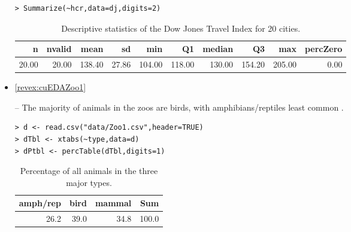 \documentclass[10pt,openany]{book}\usepackage[]{graphicx}\usepackage[]{color}
\makeatletter
\newenvironment{kframe}{%
 \def\at@end@of@kframe{}%
 \ifinner\ifhmode%
  \def\at@end@of@kframe{\end{minipage}}%
  \begin{minipage}{\columnwidth}%
 \fi\fi%
 \def\FrameCommand##1{\hskip\@totalleftmargin \hskip-\fboxsep
 \colorbox{shadecolor}{##1}\hskip-\fboxsep
     \hskip-\linewidth \hskip-\@totalleftmargin \hskip\columnwidth}%
 \MakeFramed {\advance\hsize-\width
   \@totalleftmargin\z@ \linewidth\hsize
   \@setminipage}}%
 {\par\unskip\endMakeFramed%
 \at@end@of@kframe}
\newenvironment{knitrout}{}{} %
\makeatother
\begin{document}
\begin{itemize}
\begin{knitrout}
\end{knitrout}
\begin{knitrout}
\color{fgcolor}\begin{kframe}
\begin{verbatim}
> Summarize(~hcr,data=dj,digits=2)
\end{verbatim}
\end{kframe}
\end{knitrout}
\begin{table}[ht]
\centering
\caption{Descriptive statistics of the Dow Jones Travel Index for 20 cities.} 
\label{tab:DJSum}
\begin{tabular}{rrrrrrrrrr}
  \hline
n & nvalid & mean & sd & min & Q1 & median & Q3 & max & percZero \\ 
  \hline
20.00 & 20.00 & 138.40 & 27.86 & 104.00 & 118.00 & 130.00 & 154.20 & 205.00 & 0.00 \\ 
   \hline
\end{tabular}
\end{table}



  \item \hypertarget{ans:cuEDAZoo1}{\ref{revex:cuEDAZoo1}} -- The majority of animals in the zoos are birds, with amphibians/reptiles least common .
\begin{knitrout}
\color{fgcolor}\begin{kframe}
\begin{verbatim}
> d <- read.csv("data/Zoo1.csv",header=TRUE)
> dTbl <- xtabs(~type,data=d)
> dPtbl <- percTable(dTbl,digits=1)
\end{verbatim}
\end{kframe}
\end{knitrout}
\begin{table}[ht]
\centering
\caption{Percentage of all animals in the three major types.} 
\label{tab:Zoo1}
\begin{tabular}{rrrr}
  \hline
amph/rep & bird & mammal & Sum \\ 
  \hline
26.2 & 39.0 & 34.8 & 100.0 \\ 
   \hline
\end{tabular}
\end{table}




\end{itemize}
\end{document}
